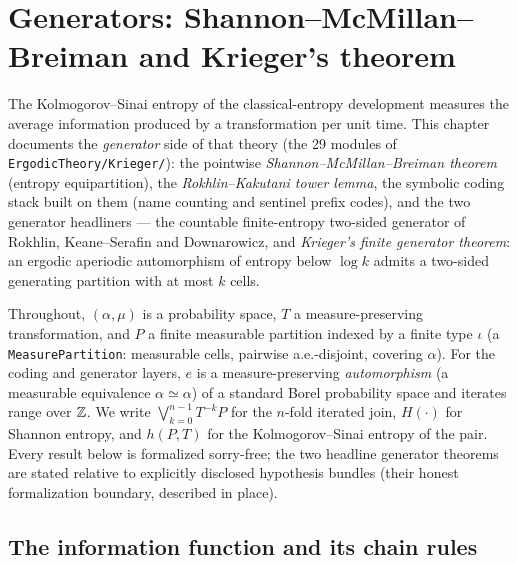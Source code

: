 \chapter{Generators: Shannon--McMillan--Breiman and Krieger's theorem}
\label{chap:krieger}

The Kolmogorov--Sinai entropy of the classical-entropy development measures the average
information produced by a transformation per unit time. This chapter documents the
\emph{generator} side of that theory (the 29 modules of \texttt{ErgodicTheory/Krieger/}): the
pointwise \emph{Shannon--McMillan--Breiman theorem} (entropy equipartition), the
\emph{Rokhlin--Kakutani tower lemma}, the symbolic coding stack built on them (name counting and
sentinel prefix codes), and the two generator headliners --- the countable finite-entropy
two-sided generator of Rokhlin, Keane--Serafin and Downarowicz, and \emph{Krieger's finite
generator theorem}: an ergodic aperiodic automorphism of entropy below \(\log k\) admits a
two-sided generating partition with at most \(k\) cells.

Throughout, \((\alpha,\mu)\) is a probability space, \(T\) a measure-preserving transformation,
and \(P\) a finite measurable partition indexed by a finite type \(\iota\) (a
\texttt{MeasurePartition}: measurable cells, pairwise a.e.-disjoint, covering \(\alpha\)). For the
coding and generator layers, \(e\) is a measure-preserving \emph{automorphism} (a measurable
equivalence \(\alpha \simeq \alpha\)) of a standard Borel probability space and iterates range
over \(\mathbb{Z}\). We write
\(\bigvee_{k=0}^{n-1} T^{-k}P\) for the \(n\)-fold iterated join, \(H(\cdot)\) for Shannon entropy,
and \(h(P,T)\) for the Kolmogorov--Sinai entropy of the pair. Every result below is formalized
sorry-free; the two headline generator theorems are stated relative to explicitly disclosed
hypothesis bundles (their honest formalization boundary, described in place).

\section{The information function and its chain rules}

